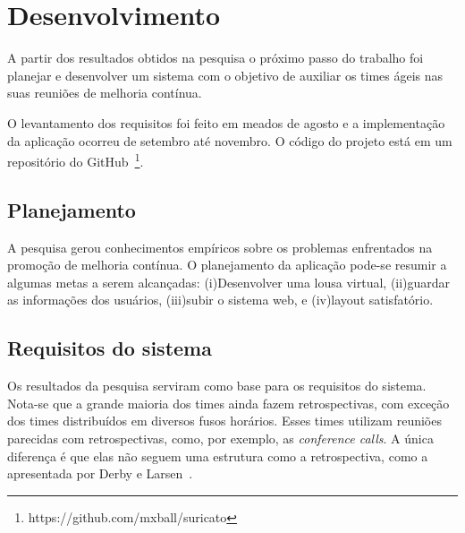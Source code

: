 \section{Desenvolvimento}



A partir dos resultados obtidos na pesquisa o próximo passo do trabalho foi planejar e desenvolver um sistema com o objetivo de auxiliar os times ágeis nas suas reuniões de melhoria contínua.

O levantamento dos requisitos foi feito em meados de agosto e a implementação da aplicação ocorreu de setembro até novembro. O código do projeto está em um repositório do GitHub~\footnote{https://github.com/mxball/suricato}.

\subsection{Planejamento}

A pesquisa gerou conhecimentos empíricos sobre os problemas enfrentados na promoção de melhoria contínua. O planejamento da aplicação pode-se resumir a algumas metas a serem alcançadas: (i)Desenvolver uma lousa virtual, (ii)guardar as informações dos usuários, (iii)subir o sistema web, e (iv)layout satisfatório.


\subsection{Requisitos do sistema}

Os resultados da pesquisa serviram como base para os requisitos do sistema. Nota-se que a grande maioria dos times ainda fazem retrospectivas, com exceção dos times distribuídos em diversos fusos horários. Esses times utilizam reuniões parecidas com retrospectivas, como, por exemplo, as \textit{conference calls}. A única diferença é que elas não seguem uma estrutura como a retrospectiva, como a apresentada por Derby e Larsen~\cite{retrospectives}. 

